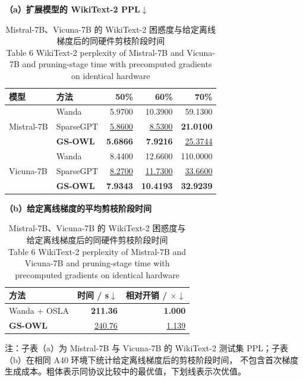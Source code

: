 \documentclass[UTF8,fontset=fandol]{ctexart}
\renewcommand{\arraystretch}{1.08}
\newcommand{\best}[1]{\textbf{#1}}
\newcommand{\second}[1]{\underline{#1}}
\begin{document}
\begin{table}[!htbp]
\centering
\caption{Mistral-7B、Vicuna-7B 的 WikiText-2 困惑度与给定离线梯度后的同硬件剪枝阶段时间\\
Table 6 WikiText-2 perplexity of Mistral-7B and Vicuna-7B and pruning-stage time with precomputed gradients on identical hardware}
\label{tab:generalization}
\begin{minipage}{0.62\textwidth}
\centering
\scriptsize
\textbf{（a）扩展模型的 WikiText-2 PPL$\downarrow$}\par\vspace{2pt}
\setlength{\tabcolsep}{3.4pt}
\renewcommand{\arraystretch}{0.98}
\begin{tabular}{llrrr}
\toprule
模型 & 方法 & 50\% & 60\% & 70\% \\
\midrule
\multirow{3}{*}{Mistral-7B}
 & Wanda & 5.9700 & 10.3900 & 59.1300 \\
 & SparseGPT & \second{5.8600} & \second{8.5300} & \best{21.0100} \\
 & \textbf{GS-OWL} & \best{5.6866} & \best{7.9216} & \second{25.3744} \\
\midrule
\multirow{3}{*}{Vicuna-7B}
 & Wanda & 8.4400 & 12.6600 & 110.0000 \\
 & SparseGPT & \second{8.2700} & \second{11.7300} & \second{33.6600} \\
 & \textbf{GS-OWL} & \best{7.9343} & \best{10.4193} & \best{32.9239} \\
\bottomrule
\end{tabular}
\end{minipage}
\hfill
\begin{minipage}{0.34\textwidth}
\centering
\scriptsize
\textbf{（b）给定离线梯度的平均剪枝阶段时间}\par\vspace{2pt}
\setlength{\tabcolsep}{3.6pt}
\renewcommand{\arraystretch}{1.00}
\begin{tabular}{lrr}
\toprule
方法 & 时间 / s$\downarrow$ & 相对开销 / $\times$$\downarrow$ \\
\midrule
Wanda + OSLA & \best{211.36} & \best{1.000} \\
\textbf{GS-OWL} & \second{240.76} & \second{1.139} \\
\bottomrule
\end{tabular}
\end{minipage}
\vspace{2pt}
\parbox{0.96\textwidth}{\scriptsize
注：子表（a）为 Mistral-7B 与 Vicuna-7B 的 WikiText-2 测试集 PPL；子表（b）在相同 A40 环境下统计给定离线梯度后的剪枝阶段时间，
不包含首次梯度生成成本。粗体表示同协议比较中的最优值，下划线表示次优值。}
\end{table}
\end{document}
